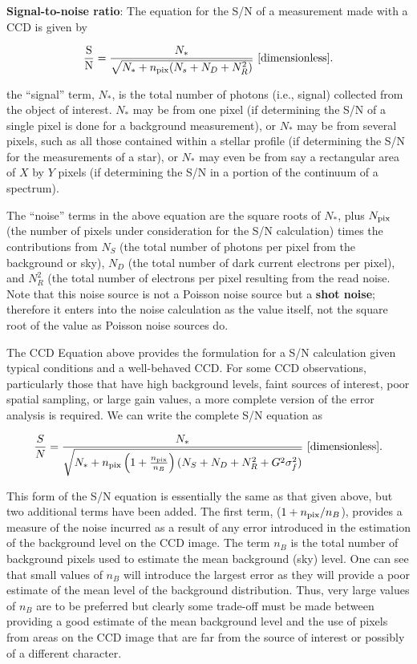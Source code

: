 \documentclass[a4paper,10pt]{article}
\begin{document}
{\noindent}\textbf{Signal-to-noise ratio}: The equation for the S/N of a measurement made with a CCD is given by

\begin{align*}
    \frac{\rm S}{\rm N} = \frac{N_*}{\sqrt{N_*+n_{\rm pix}(N_s+N_D+N_R^2)}} ~ [{\rm dimensionless}].
\end{align*}

{\noindent}the ``signal'' term, $N_*$, is the total number of photons (i.e., signal) collected from the object of interest. $N_*$ may be from one pixel (if determining the S/N of a single pixel is done for a background measurement), or $N_*$ may be from several pixels, such as all those contained within a stellar profile (if determining the S/N for the measurements of a star), or $N_*$ may even be from say a rectangular area of $X$ by $Y$ pixels (if determining the S/N in a portion of the continuum of a spectrum). 

{\noindent}The ``noise'' terms in the above equation are the square roots of $N_*$, plus $N_{\rm pix}$ (the number of pixels under consideration for the S/N calculation) times the contributions from $N_S$ (the total number of photons per pixel from the background or sky), $N_D$ (the total number of dark current electrons per pixel), and $N_R^2$ (the total number of electrons per pixel resulting from the read noise. Note that this noise source is not a Poisson noise source but a \textbf{shot noise}; therefore it enters into the noise calculation as the value itself, not the square root of the value as Poisson noise sources do.

{\noindent}The CCD Equation above provides the formulation for a S/N calculation given typical conditions and a well-behaved CCD. For some CCD observations, particularly those that have high background levels, faint sources of interest, poor spatial sampling, or large gain values, a more complete version of the error analysis is required. We can write the complete S/N equation as

\begin{align*}
    \frac{S}{N} = \frac{N_*}{\sqrt{N_*+n_{\rm pix}\left(1+\frac{n_{\rm pix}}{n_B}\right)(N_S+N_D+N_R^2+G^2\sigma_f^2)}} ~ [{\rm dimensionless}].
\end{align*}

{\noindent}This form of the S/N equation is essentially the same as that given above, but two additional terms have been added. The first term,  ($1+n_{\rm pix}/n_B$), provides a measure of the noise incurred as a result of any error introduced in the estimation of the background level on the CCD image. The term $n_B$ is the total number of background pixels used to estimate the mean background (sky) level. One can see that small values of $n_B$ will introduce the largest error as they will provide a poor estimate of the mean level of the background distribution. Thus, very large values of $n_B$ are to be preferred but clearly some trade-off must be made between providing a good estimate of the mean background level and the use of pixels from areas on the CCD image that are far from the source of interest or possibly of a different character.
\end{document}

